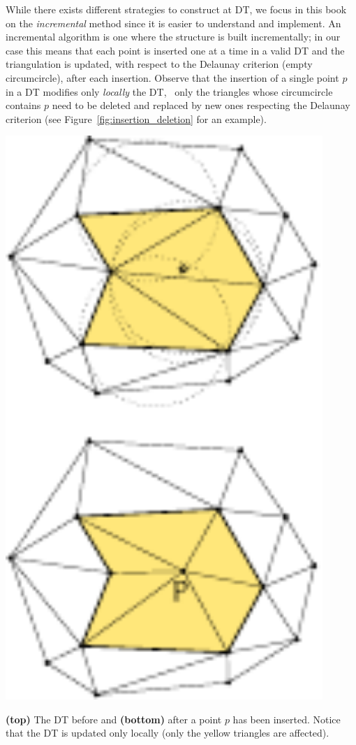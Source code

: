 While there exists different strategies to construct at DT, we focus in this book on the \emph{incremental} method since it is easier to understand and implement.
An incremental algorithm is one where the structure is built incrementally; in our case this means that each point is inserted one at a time in a valid DT and the triangulation is updated, with respect to the Delaunay criterion (empty circumcircle), after each insertion. 
Observe that the insertion of a single point $p$ in a DT modifies only \emph{locally} the DT, \ie\ only the triangles whose circumcircle contains $p$ need to be deleted and replaced by new ones respecting the Delaunay criterion (see Figure~\ref{fig:insertion_deletion} for an example). 
\begin{marginfigure}
  \centering
  \includegraphics[width=0.9\textwidth]{insertion_deletion}
  \caption{\textbf{(top)} The DT before and \textbf{(bottom)} after a point $p$ has been inserted. Notice that the DT is updated only locally (only the yellow triangles are affected).}%
\label{fig:insertion_deletion}
\end{marginfigure}

